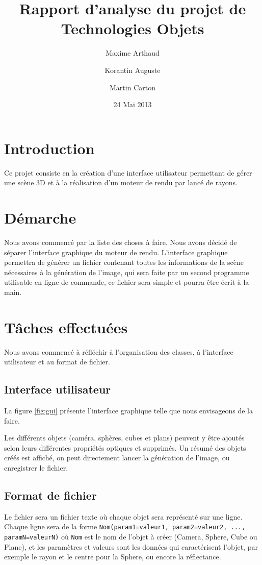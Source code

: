 \documentclass[a4paper]{article}
\title{Rapport d'analyse du projet de Technologies Objets}
\author{Maxime Arthaud \and Korantin Auguste \and Martin Carton}
\date{24 Mai 2013}
\begin{document}
\maketitle

\section{Introduction}
  Ce projet consiste en la création d'une interface utilisateur permettant de
  gérer une scène 3D et à la réalisation d'un moteur de rendu par lancé de
  rayons.

\section{Démarche}
  Nous avons commencé par la liste des choses à faire. Nous avons décidé
  de séparer l'interface graphique du moteur de rendu. L'interface
  graphique permettra de générer un fichier contenant toutes les informations
  de la scène nécessaires à la génération de l'image, qui sera faite par un
  second programme utilisable en ligne de commande, ce fichier sera simple et
  pourra être écrit à la main.

\section{Tâches effectuées}
  Nous avons commencé à réfléchir à l'organisation des classes, à l'interface
  utilisateur et au format de fichier.

  \subsection{Interface utilisateur}
    La figure \ref{fig:gui} présente l'interface graphique telle que nous
    envisageons de la faire.

    Les différents objets (caméra,
    sphères, cubes et plans) peuvent y être ajoutés selon leurs différentes
    propriétés optiques et supprimés. Un résumé des objets créés est affiché, on
    peut directement lancer la génération de l'image, ou enregistrer le fichier.

  \subsection{Format de fichier}
    Le fichier sera un fichier texte où chaque objet sera représenté sur une
    ligne. Chaque ligne sera de la forme
    \verb+Nom(param1=valeur1, param2=valeur2, ..., paramN=valeurN)+
    où \verb+Nom+ est le nom de l'objet à créer (Camera, Sphere, Cube ou
    Plane), et les paramètres et
    valeurs sont les données qui caractérisent l'objet, par exemple le rayon
    et le centre pour la Sphere, ou encore la réflectance.
\end{document}
